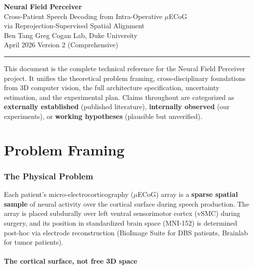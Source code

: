 \documentclass[11pt,letterpaper]{article}
\begin{document}
\begin{center}
{\LARGE\bfseries Neural Field Perceiver}\\[6pt]
{\large Cross-Patient Speech Decoding from Intra-Operative $\mu$ECoG\\via Reprojection-Supervised Spatial Alignment}\\[12pt]
{\normalsize Ben Tang \quad\textbar\quad Greg Cogan Lab, Duke University}\\[4pt]
{\normalsize April 2026 \quad\textbar\quad Version 2 (Comprehensive)}
\end{center}

\medskip\noindent\rule{\textwidth}{0.4pt}\medskip

\noindent This document is the complete technical reference for the Neural Field Perceiver project. It unifies the theoretical problem framing, cross-disciplinary foundations from 3D computer vision, the full architecture specification, uncertainty estimation, and the experimental plan. Claims throughout are categorized as \textbf{externally established} (published literature), \textbf{internally observed} (our experiments), or \textbf{working hypotheses} (plausible but unverified).

\tableofcontents
\newpage



\part{Problem Framing}

\section{The Physical Problem}

Each patient's micro-electrocorticography ($\mu$ECoG) array is a \textbf{sparse spatial sample} of neural activity over the cortical surface during speech production. The array is placed subdurally over left ventral sensorimotor cortex (vSMC) during surgery, and its position in standardized brain space (MNI-152) is determined post-hoc via electrode reconstruction (BioImage Suite for DBS patients, Brainlab for tumor patients).

\subsection{The cortical surface, not free 3D space}
\end{document}
